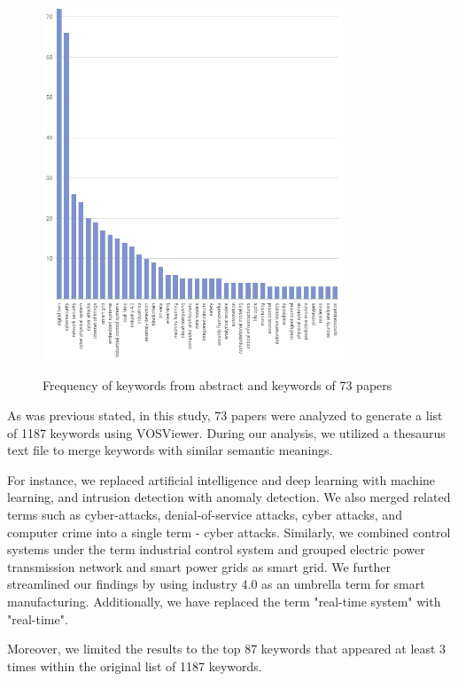 \begin{figure}[H]
    \caption{Frequency of keywords from abstract and keywords of 73 papers}
    \includegraphics[width=0.8\textwidth]{images/keyword_occurance.png}
    \label{fig:alluvial-key}
\end{figure}
As was previous stated, in this study, 73 papers were analyzed to generate a list of 1187 keywords using VOSViewer. During our analysis, we utilized a thesaurus text file to merge keywords with similar semantic meanings.

For instance, we replaced artificial intelligence and deep learning with machine learning, and intrusion detection with anomaly detection. We also merged related terms such as cyber-attacks, denial-of-service attacks, cyber attacks, and computer crime into a single term - cyber attacks. Similarly, we combined control systems under the term industrial control system and grouped electric power transmission network and smart power grids as smart grid. We further streamlined our findings by using industry 4.0 as an umbrella term for smart manufacturing. Additionally, we have replaced the term "real-time system" with "real-time". 

Moreover, we limited the results to the top 87 keywords that appeared at least 3 times within the original list of 1187 keywords.  



